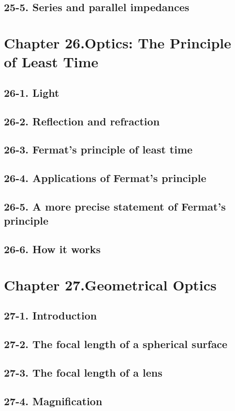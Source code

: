 \documentclass{article}
\begin{document}
\subsection{25-5. Series and parallel impedances}
\section{Chapter 26.Optics: The Principle of Least Time}
\subsection{26-1. Light}
\subsection{26-2. Reflection and refraction}
\subsection{26-3. Fermat’s principle of least time}
\subsection{26-4. Applications of Fermat’s principle}
\subsection{26-5. A more precise statement of Fermat’s principle}
\subsection{26-6. How it works}
\section{Chapter 27.Geometrical Optics}
\subsection{27-1. Introduction}
\subsection{27-2. The focal length of a spherical surface}
\subsection{27-3. The focal length of a lens}
\subsection{27-4. Magnification}
\end{document}
